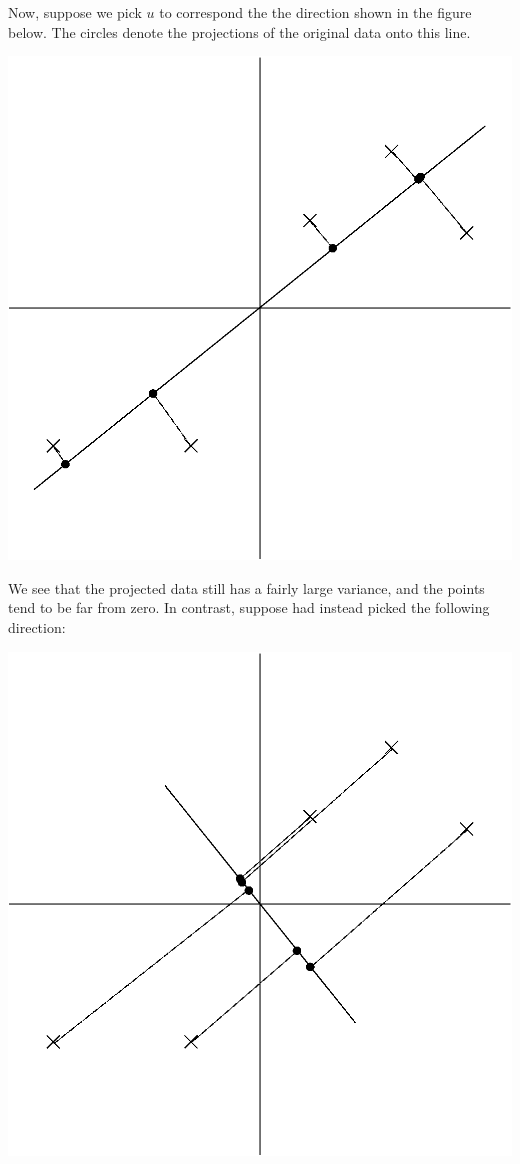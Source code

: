 \documentclass{article}
\begin{document}
Now, suppose we pick $u$ to correspond the the direction shown in the figure below. The circles denote the projections of the original data onto this line.
\begin{center}
\includegraphics[scale=0.5]{proj1.eps}
\end{center}

We see that the projected data still has a fairly large variance, and the points tend to be far from zero. In contrast, suppose had instead picked the following direction:

\begin{center}
\includegraphics[scale=0.5]{proj2.eps}
\end{center}
\end{document}

